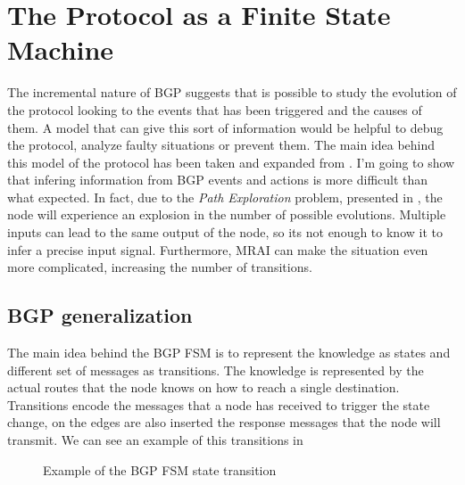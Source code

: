 \chapter{The Protocol as a Finite State Machine}
\label{cha:bgp_fsm}

The incremental nature of \ac{BGP} suggests that is possible to study the
evolution of the protocol looking to the events that has been triggered
and the causes of them.
A model that can give this sort of information would be helpful to debug 
the protocol, analyze faulty situations or prevent them.
The main idea behind this model of the protocol has been taken and 
expanded from \cite{griffinFSM}.
I'm going to show that infering information from \ac{BGP} events and actions
is more difficult than what expected.
In fact, due to the \textit{Path Exploration} problem, presented in ,
the node will experience an explosion in the number of possible evolutions.
Multiple inputs can lead to the same output of the node, so its not enough to
know it to infer a precise input signal.
Furthermore, \ac{MRAI} can make the situation even more complicated, increasing
the number of transitions.

\section{BGP generalization}
\label{sec:bgp_generalization}

The main idea behind the \ac{BGP} \ac{FSM} is to represent the knowledge as
states and different set of messages as transitions.
The knowledge is represented by the actual routes that the node knows on how 
to reach a single destination.
Transitions encode the messages that a node has received to trigger the state change,
on the edges are also inserted the response messages that the node will transmit.
We can see an example of this transitions in 

\begin{figure}[h]                                                               
    \begin{center}                                                              
        
    \end{center}                                                                
	\caption{Example of the \ac{BGP} \ac{FSM} state transition}
    \label{fig:fsm_example}                                                   
\end{figure}

